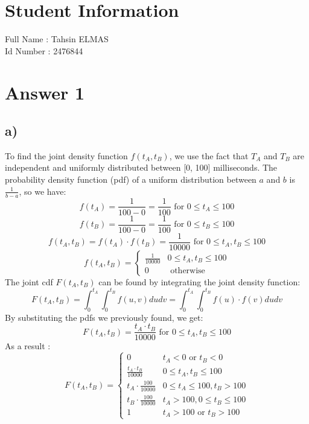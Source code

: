 \documentclass[12pt]{article}
\begin{document}
\section*{Student Information } 
Full Name :  Tahsin ELMAS\\
Id Number :  2476844\\

\section*{Answer 1}

\subsection*{a)} To find the joint density function $f(t_A, t_B)$, we use the fact that $T_A$ and $T_B$ are independent and uniformly distributed between [0, 100] milliseconds. The probability density function (pdf) of a uniform distribution between $a$ and $b$ is $\frac{1}{b-a}$, so we have:\\

$$ f\left(t_A\right)=\frac{1}{100-0}=\frac{1}{100} \text { for } 0 \leq t_A \leq 100 $$
$$f\left(t_B\right)=\frac{1}{100-0}=\frac{1}{100} \text { for } 0 \leq t_B \leq 100 $$
$$f\left(t_A, t_B\right)=f\left(t_A\right) \cdot f\left(t_B\right)=\frac{1}{10000} \text { for } 0 \leq t_A, t_B \leq 100$$
$$f\left(t_A, t_B\right)= \begin{cases}\frac{1}{10000} & 0 \leq t_A, t_B \leq 100 \\ 0 & \text { otherwise }\end{cases}$$
The joint cdf $F(t_A, t_B)$ can be found by integrating the joint density function:
$$ F\left(t_A, t_B\right)=\int_0^{t_A} \int_0^{t_B} f(u, v) d u d v=\int_0^{t_A} \int_0^{t_B} f(u) \cdot f(v) d u d v $$
By substituting the pdfs we previously found, we get:
$$ F\left(t_A, t_B\right)=\frac{t_A \cdot t_B}{10000} \text { for } 0 \leq t_A, t_B \leq 100$$
As a result :
$$F\left(t_A, t_B\right)= \begin{cases}0 & t_A<0 \text { or } t_B<0 \\ \frac{t_A \cdot t_B}{10000} & 0 \leq t_A, t_B \leq 100 \\ t_A \cdot \frac{100}{10000} & 0 \leq t_A \leq 100, t_B>100 \\ t_B \cdot \frac{100}{10000} & t_A>100,0 \leq t_B \leq 100 \\ 1 & t_A>100 \text { or } t_B>100\end{cases}$$
\end{document}
